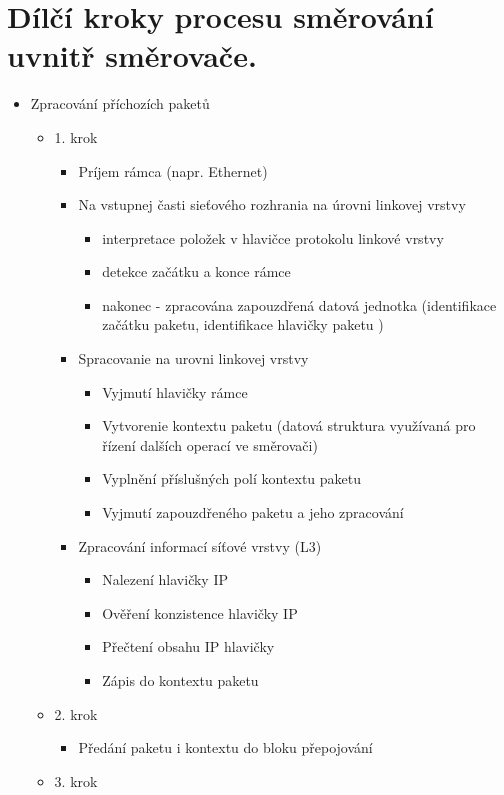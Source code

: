 \section{Dílčí kroky procesu směrování uvnitř směrovače.}
\begin{itemize}
\item Zpracování příchozích paketů
\begin{itemize}
\item 1. krok
\begin{itemize}
\item Príjem rámca (napr. Ethernet)
\item Na vstupnej časti sieťového rozhrania na úrovni linkovej vrstvy
\begin{itemize}
\item interpretace položek v hlavičce protokolu linkové vrstvy 
\item detekce začátku a konce rámce
\item nakonec - zpracována zapouzdřená datová jednotka (identifikace začátku paketu, identifikace hlavičky paketu )
\end{itemize}
\item Spracovanie na urovni linkovej vrstvy
\begin{itemize}
\item Vyjmutí hlavičky rámce 
\item Vytvorenie kontextu paketu (datová struktura využívaná pro řízení dalších operací ve směrovači) 
\item Vyplnění příslušných polí kontextu paketu
\item Vyjmutí zapouzdřeného paketu a jeho zpracování 
\end{itemize}
\item Zpracování informací síťové vrstvy (L3)
\begin{itemize}
\item Nalezení hlavičky IP
\item Ověření konzistence hlavičky IP
\item Přečtení obsahu IP hlavičky
\item Zápis do kontextu paketu
\end{itemize}
\end{itemize}
\item 2. krok
\begin{itemize}
\item Předání paketu i kontextu do bloku přepojování
\end{itemize}
\item 3. krok
\begin{itemize}

\end{itemize}
\end{itemize}
\end{itemize}
